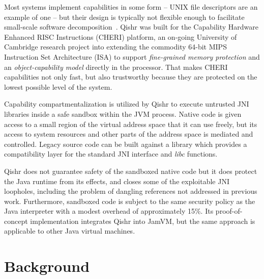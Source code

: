 \documentclass[a4paper,12pt,twoside,openright]{report}
\newcommand{\tool}[1]{\emph{#1}}
\newcommand{\lib}[1]{\tool{lib#1}}
\begin{document}
Most systems implement capabilities in some form -- UNIX file descriptors are an example of one -- but their design is typically not flexible enough to facilitate small-scale software decomposition~\cite{Watson:2010:CPC:1929820.1929824}. Qishr was built for the Capability Hardware Enhanced RISC Instructions (CHERI) platform, an on-going University of Cambridge research project into extending the commodity 64-bit MIPS Instruction Set Architecture (ISA) to support \emph{fine-grained memory protection} and an \emph{object-capability model} directly in the processor. That makes CHERI capabilities not only fast, but also trustworthy because they are protected on the lowest possible level of the system.
 
Capability compartmentalization is utilized by Qishr to execute untrusted JNI libraries inside a safe sandbox within the JVM process. Native code is given access to a small region of the virtual address space that it can use freely, but its access to system resources and other parts of the address space is mediated and controlled. Legacy source code can be built against a library which provides a compatibility layer for the standard JNI interface and \lib{c} functions.

Qishr does not guarantee safety of the sandboxed native code but it does protect the Java runtime from its effects, and closes some of the exploitable JNI loopholes, including the problem of dangling references not addressed in previous work. Furthermore, sandboxed code is subject to the same security policy as the Java interpreter with a modest overhead of approximately 15\%. Its proof-of-concept implementation integrates Qishr into JamVM, but the same approach is applicable to other Java virtual machines.

\chapter{Background} 

% 
\end{document}
